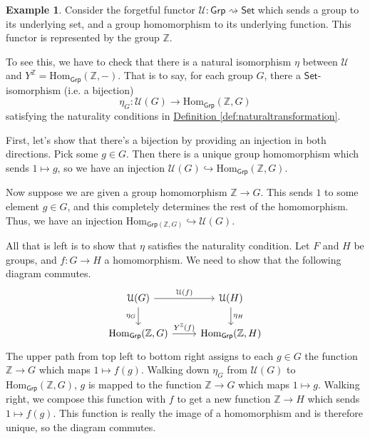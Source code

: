 \documentclass[a4paper,10pt]{scrreprt}
\newcommand{\Z}{\mathbb{Z}}
\newcommand{\Hom}{\mathrm{Hom}}
\theoremstyle{definition}
\newtheorem{example}{Example}[section]
\theoremstyle{plain}
\theoremstyle{remark}
\begin{document}
\begin{example}
  Consider the forgetful functor $\mathcal{U}\colon \mathsf{Grp} \rightsquigarrow \mathsf{Set}$ which sends a group to its underlying set, and a group homomorphism to its underlying function. This functor is represented by the group $\Z$.

  To see this, we have to check that there is a natural isomorphism $\eta$ between $\mathcal{U}$ and $Y^{\Z} = \Hom_{\mathsf{Grp}}(\Z, -)$. That is to say, for each group $G$, there a $\mathsf{Set}$-isomorphism (i.e. a bijection)
  \begin{equation*}
    \eta_{G}\colon \mathcal{U}(G) \to \Hom_{\mathsf{Grp}}(\Z, G)
  \end{equation*}
  satisfying the naturality conditions in \hyperref[def:naturaltransformation]{Definition \ref*{def:naturaltransformation}}.

  First, let's show that there's a bijection by providing an injection in both directions. Pick some $g \in G$. Then there is a unique group homomorphism which sends $1 \mapsto g$, so we have an injection $\mathcal{U}(G) \hookrightarrow \Hom_{\mathsf{Grp}}(\Z, G)$.

  Now suppose we are given a group homomorphism $\Z \to G$. This sends $1$ to some element $g \in G$, and this completely determines the rest of the homomorphism. Thus, we have an injection $\Hom_{\mathsf{Grp}(\Z, G)} \hookrightarrow \mathcal{U}(G)$.

  All that is left is to show that $\eta$ satisfies the naturality condition. Let $F$ and $H$ be groups, and $f\colon G \to H$ a homomorphism. We need to show that the following diagram commutes.
  \begin{equation*}
    \begin{tikzcd}
      \mathcal{U}(G)
      \arrow[r, "\mathcal{U}(f)"]
      \arrow[d, swap, "\eta_{G}"]
      & \mathcal{U}(H)
      \arrow[d, "\eta_{H}"]
      \\
      \Hom_{\mathsf{Grp}}(\Z, G)
      \arrow[r, "Y^{\Z}(f)"]
      & \Hom_{\mathsf{Grp}}(\Z, H)
    \end{tikzcd}
  \end{equation*}
  The upper path from top left to bottom right assigns to each $g \in G$ the function $\Z \to G$ which maps $1 \mapsto f(g)$. Walking down $\eta_{G}$ from $\mathcal{U}(G)$ to $\Hom_{\mathsf{Grp}}(\Z, G)$, $g$ is mapped to the function $\Z \to G$ which maps $1 \mapsto g$. Walking right, we compose this function with $f$ to get a new function $\Z \to H$ which sends $1 \mapsto f(g)$. This function is really the image of a homomorphism and is therefore unique, so the diagram commutes.
\end{example}
\end{document}
